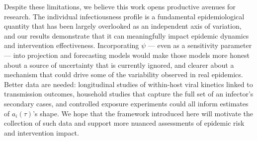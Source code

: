 Despite these limitations, we believe this work opens productive avenues for research. The individual infectiousness profile is a fundamental epidemiological quantity that has been largely overlooked as an independent axis of variation, and our results demonstrate that it can meaningfully impact epidemic dynamics and intervention effectiveness. Incorporating $\psi$ --- even as a sensitivity parameter --- into projection and forecasting models would make those models more honest about a source of uncertainty that is currently ignored, and clearer about a mechanism that could drive some of the variability observed in real epidemics. Better data are needed: longitudinal studies of within-host viral kinetics linked to transmission outcomes, household studies that capture the full set of an infector's secondary cases, and controlled exposure experiments could all inform estimates of $a_i(\tau)$'s shape. We hope that the framework introduced here will motivate the collection of such data and support more nuanced assessments of epidemic risk and intervention impact.

